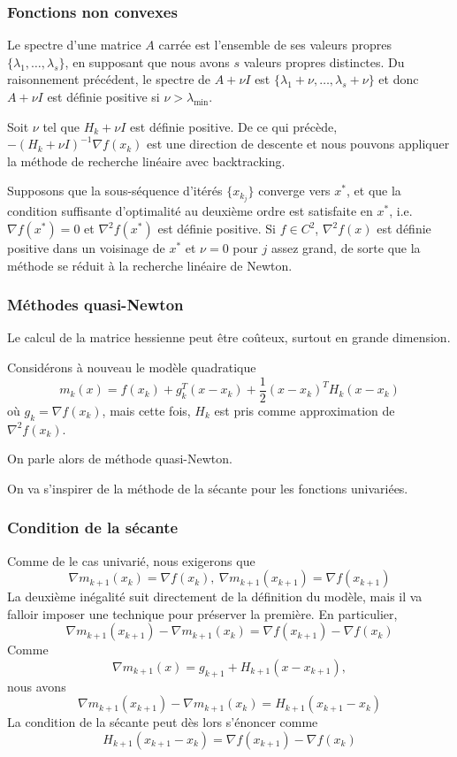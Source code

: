 \documentclass[usepdftitle=false]{beamer}
\def\red{\color{red}}
\begin{document}
\begin{frame}
\frametitle{Fonctions non convexes}

Le spectre d'une matrice $A$ carrée est l'ensemble de ses valeurs propres $\lbrace \lambda_1,\dots,\lambda_s \rbrace$, en supposant que nous avons $s$ valeurs propres distinctes.
Du raisonnement précédent, le spectre de $A+\nu I$ est $\lbrace \lambda_1+\nu,\dots,\lambda_s + \nu \rbrace$ et donc $A + \nu I$ est définie positive si $\nu > \lambda_{\min}$.

\mbox{}

Soit $\nu$ tel que $H_k + \nu I$ est définie positive. De ce qui précède, $-(H_k + \nu I)^{-1} \nabla f(x_k)$ est une direction de descente et nous pouvons appliquer la méthode de recherche linéaire avec backtracking.

\mbox{}

Supposons que la sous-séquence d'itérés $\lbrace x_{k_j} \rbrace$ converge vers $x^*$, et que la condition suffisante d'optimalité au deuxième ordre est satisfaite en $x^*$, i.e. $\nabla f(x^*) = 0$ et $\nabla^2 f(x^*)$ est définie positive.
Si $f \in C^2$, $\nabla^2 f(x)$ est définie positive dans un voisinage de $x^*$ et $\nu = 0$ pour $j$ assez grand, de sorte que la méthode se réduit à la recherche linéaire de Newton.

\end{frame}

\begin{frame}
\frametitle{Méthodes quasi-Newton}

Le calcul de la matrice hessienne peut être coûteux, surtout en grande dimension.

\mbox{}

Considérons à nouveau le modèle quadratique
$$
m_k(x) = f(x_k) + g_k^T(x-x_k) + \frac{1}{2} (x-x_k)^T H_k (x-x_k)
$$
où $g_k = \nabla f(x_k)$, mais cette fois, $H_k$ est pris comme approximation de $\nabla^2 f(x_k)$.

\mbox{}

On parle alors de méthode {\red quasi-Newton}.

\mbox{}

On va s'inspirer de la méthode de la sécante pour les fonctions univariées.

\end{frame}

\begin{frame}
\frametitle{Condition de la sécante}

Comme de le cas univarié, nous exigerons que
$$
\nabla m_{k+1}(x_k) = \nabla f(x_k),\ 
\nabla m_{k+1}(x_{k+1}) = \nabla f(x_{k+1})
$$
La deuxième inégalité suit directement de la définition du modèle, mais il va falloir imposer une technique pour préserver la première.
En particulier,
$$
\nabla m_{k+1}(x_{k+1}) - \nabla m_{k+1}(x_k) = \nabla f(x_{k+1}) - \nabla f(x_k)
$$
Comme
$$
\nabla m_{k+1}(x) = g_{k+1} + H_{k+1}(x-x_{k+1}),
$$
nous avons
$$
\nabla m_{k+1}(x_{k+1}) - \nabla m_{k+1}(x_k) = H_{k+1}(x_{k+1} - x_k)
$$
La {\red condition de la sécante} peut dès lors s'énoncer comme
$$
H_{k+1}(x_{k+1} - x_k) = \nabla f(x_{k+1}) - \nabla f(x_k)
$$

\end{frame}
\end{document}
